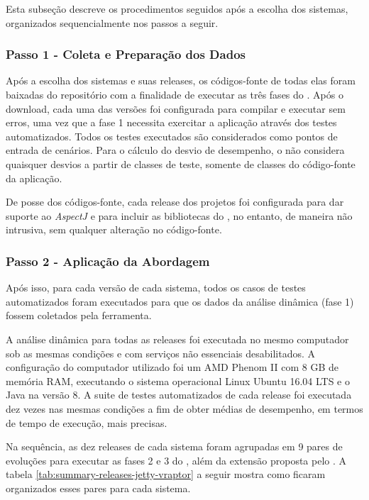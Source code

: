 Esta subseção descreve os procedimentos seguidos após a escolha dos sistemas, organizados sequencialmente nos passos a seguir.

\subsubsection{Passo 1 - Coleta e Preparação dos Dados} \label{subsec:avaliacao-procedimentos-passo-1}

Após a escolha dos sistemas e suas releases, os códigos-fonte de todas elas foram baixadas do repositório com a finalidade de executar as três fases do \textit{\perfMinerName}. Após o download, cada uma das versões foi configurada para compilar e executar sem erros, uma vez que a fase 1 necessita exercitar a aplicação através dos testes automatizados. Todos os testes executados são considerados como pontos de entrada de cenários. Para o cálculo do desvio de desempenho, o \textit{\perfMinerName} não considera quaisquer desvios a partir de classes de teste, somente de classes do código-fonte da aplicação.

De posse dos códigos-fonte, cada release dos projetos foi configurada para dar suporte ao \textit{AspectJ} e para incluir as bibliotecas do \textit{\perfMinerName}, no entanto, de maneira não intrusiva, sem qualquer alteração no código-fonte.

\subsubsection{Passo 2 - Aplicação da Abordagem} \label{subsec:avaliacao-procedimentos-passo-2}

Após isso, para cada versão de cada sistema, todos os casos de testes automatizados foram executados para que os dados da análise dinâmica (fase 1) fossem coletados pela ferramenta.

A análise dinâmica para todas as releases foi executada no mesmo computador sob as mesmas condições e com serviços não essenciais desabilitados. A configuração do computador utilizado foi um AMD Phenom II com 8 GB de memória RAM, executando o sistema operacional Linux Ubuntu 16.04 LTS e o Java na versão 8. A suite de testes automatizados de cada release foi executada dez vezes nas mesmas condições a fim de obter médias de desempenho, em termos de tempo de execução, mais precisas.

Na sequência, as dez releases de cada sistema foram agrupadas em 9 pares de evoluções para executar as fases 2 e 3 do \textit{\perfMinerName}, além da extensão proposta pelo \textit{\toolName}. A tabela \ref{tab:summary-releases-jetty-vraptor} a seguir mostra como ficaram organizados esses pares para cada sistema.


